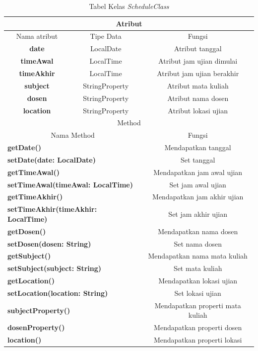 \begin{table}[H]
	\centering
		\caption{Tabel Kelas \textit{ScheduleClass}}
		\label{tab:schedule_class}
		\begin{tabular}{ | c | c | c |}
			\hline
				\multicolumn{3}{|c|}{Atribut} \\ \hline 
				Nama atribut & Tipe Data  & Fungsi \\ \hline
				\textbf{date} & LocalDate & Atribut tanggal\\ \hline
				\textbf{timeAwal} & LocalTime & Atribut jam ujian dimulai\\ \hline
				\textbf{timeAkhir} & LocalTime & Atribut jam ujian berakhir\\ \hline
				\textbf{subject} & StringProperty & Atribut mata kuliah\\ \hline
				\textbf{dosen} & StringProperty & Atribut nama dosen\\ \hline
				\textbf{location} & StringProperty & Atribut lokasi ujian\\ \hline
				\multicolumn{3}{|c|}{Method} \\ \hline
				\multicolumn{2}{|c|}{Nama Method} & Fungsi \\ \hline
				\multicolumn{2}{|l|}{\textbf{getDate()}} & Mendapatkan tanggal\\ \hline
				\multicolumn{2}{|l|}{\textbf{setDate(date: LocalDate)}} & Set tanggal \\ \hline
				\multicolumn{2}{|l|}{\textbf{getTimeAwal()}} & Mendapatkan jam awal ujian \\ \hline
				\multicolumn{2}{|l|}{\textbf{setTimeAwal(timeAwal: LocalTime)}} & Set jam awal ujian\\ \hline
				\multicolumn{2}{|l|}{\textbf{getTimeAkhir()}} & Mendapatkan jam akhir ujian\\ \hline
				\multicolumn{2}{|l|}{\textbf{setTimeAkhir(timeAkhir: LocalTime)}} & Set jam akhir ujian\\ \hline
				\multicolumn{2}{|l|}{\textbf{getDosen()}} & Mendapatkan nama dosen\\ \hline
				\multicolumn{2}{|l|}{\textbf{setDosen(dosen: String)}} & Set nama dosen\\ \hline
				\multicolumn{2}{|l|}{\textbf{getSubject()}} & Mendapatkan nama mata kuliah\\ \hline
				\multicolumn{2}{|l|}{\textbf{setSubject(subject: String)}}& Set mata kuliah \\ \hline
				\multicolumn{2}{|l|}{\textbf{getLocation()}} & Mendapatkan lokasi ujian\\ \hline
				\multicolumn{2}{|l|}{\textbf{setLocation(location: String)}} & Set lokasi ujian\\ \hline
				\multicolumn{2}{|l|}{\textbf{subjectProperty()}} & Mendapatkan properti mata kuliah\\ \hline
				\multicolumn{2}{|l|}{\textbf{dosenProperty()}} & Mendapatkan properti dosen\\ \hline
				\multicolumn{2}{|l|}{\textbf{location()}} & Mendapatkan properti lokasi\\ \hline
		\end{tabular}
\end{table}

